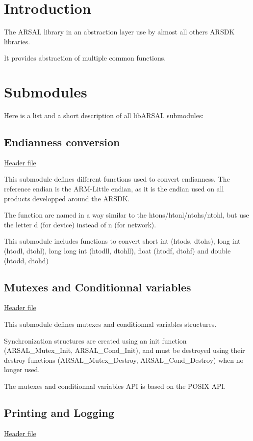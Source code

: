 \hypertarget{index_SAL_intro_sec}{}\section{Introduction}\label{index_SAL_intro_sec}
The A\+R\+S\+AL library in an abstraction layer use by almost all others A\+R\+S\+DK libraries.

It provides abstraction of multiple common functions.\hypertarget{index_SAL_modules_sec}{}\section{Submodules}\label{index_SAL_modules_sec}
Here is a list and a short description of all lib\+A\+R\+S\+AL submodules\+:\hypertarget{index_SAL_endianness_subsec}{}\subsection{Endianness conversion}\label{index_SAL_endianness_subsec}
\hyperlink{}{Header file }

This submodule defines different functions used to convert endianness. The reference endian is the A\+R\+M-\/\+Little endian, as it is the endian used on all products developped around the A\+R\+S\+DK.

The function are named in a way similar to the htons/htonl/ntohs/ntohl, but use the letter \textquotesingle{}d\textquotesingle{} (for device) instead of \textquotesingle{}n\textquotesingle{} (for network).

This submodule includes functions to convert short int (htods, dtohs), long int (htodl, dtohl), long long int (htodll, dtohll), float (htodf, dtohf) and double (htodd, dtohd)\hypertarget{index_SAL_mutex_subsec}{}\subsection{Mutexes and Conditionnal variables}\label{index_SAL_mutex_subsec}
\hyperlink{}{Header file }

This submodule defines mutexes and conditionnal variables structures.

Synchronization structures are created using an init function (A\+R\+S\+A\+L\+\_\+\+Mutex\+\_\+\+Init, A\+R\+S\+A\+L\+\_\+\+Cond\+\_\+\+Init), and must be destroyed using their destroy functions (A\+R\+S\+A\+L\+\_\+\+Mutex\+\_\+\+Destroy, A\+R\+S\+A\+L\+\_\+\+Cond\+\_\+\+Destroy) when no longer used.

The mutexes and conditionnal variables A\+PI is based on the P\+O\+S\+IX A\+PI.\hypertarget{index_SAL_print_subsec}{}\subsection{Printing and Logging}\label{index_SAL_print_subsec}
\hyperlink{}{Header file }

